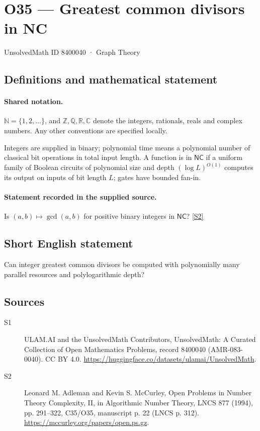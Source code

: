 \documentclass[11pt]{article}
\newcommand{\sref}[2]{\hyperlink{source:#1:#2}{[S#2]}}
\begin{document}
\setcounter{section}{8400039}
\section{O35 — Greatest common divisors in NC}\label{8400040}
{\small\sffamily UnsolvedMath ID 8400040 · Graph Theory}
\subsection{Definitions and mathematical statement}

\paragraph{Shared notation.}$\mathbb N=\{1,2,\ldots\}$, and $\mathbb Z,\mathbb Q,\mathbb R,\mathbb C$ denote the integers, rationals, reals and complex numbers. Any other conventions are specified locally.


Integers are supplied in binary; polynomial time means a polynomial number of classical bit operations in total input length. A function is in $\mathsf{NC}$ if a uniform family of Boolean circuits of polynomial size and depth $(\log L)^{O(1)}$ computes its output on inputs of bit length $L$; gates have bounded fan-in.
\paragraph{Statement recorded in the supplied source.}
Is $(a,b)\mapsto\gcd(a,b)$ for positive binary integers in $\mathsf{NC}$? \sref{8400040}{2}
\subsection{Short English statement}
Can integer greatest common divisors be computed with polynomially many parallel resources and polylogarithmic depth?
\subsection{Sources}
\begin{description}
\item[\hypertarget{source:8400040:1}{S1}] ULAM.AI and the UnsolvedMath Contributors, UnsolvedMath: A Curated Collection of Open Mathematics Problems, record 8400040 (AMR-083-0040). CC BY 4.0. \url{https://huggingface.co/datasets/ulamai/UnsolvedMath}.
\item[\hypertarget{source:8400040:2}{S2}] Leonard M. Adleman and Kevin S. McCurley, Open Problems in Number Theory Complexity, II, in Algorithmic Number Theory, LNCS 877 (1994), pp. 291--322, C35/O35, manuscript p. 22 (LNCS p. 312). \url{https://mccurley.org/papers/open.ps.gz}.
\end{description}
\label{end:8400040}
\end{document}
